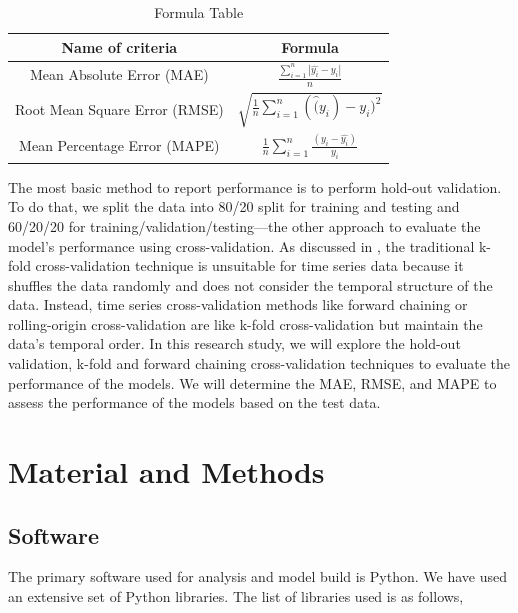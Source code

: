 \documentclass[mstat,12pt]{unswthesis}
\begin{document}
\begin{table}[h]
\centering
\caption{Formula Table}
\begin{tabular}{|c|c|}
\hline
\textbf{Name of criteria} & \textbf{Formula} \\ 
\hline
Mean Absolute Error (MAE) & $\frac{\sum_{i=1}^n|\hat{y_i}-y_i|}{n}$ \\ 
\hline
Root Mean Square Error (RMSE) & $\sqrt{\frac{1}{n}\sum_{i=1}^{n}(\hat(y_i) - y_i)^2}$ \\ 
\hline
Mean Percentage Error (MAPE) & $\frac{1}{n}\sum_{i=1}^{n}\frac{(y_i-\hat{y_i})}{y_i}$ \\ 
\hline
\end{tabular}
\end{table}

The most basic method to report performance is to perform hold-out
validation. To do that, we split the data into 80/20 split for training
and testing and 60/20/20 for training/validation/testing---the other
approach to evaluate the model's performance using cross-validation. As
discussed in \cite{rafferty2023forecasting}, the traditional k-fold
cross-validation technique is unsuitable for time series data because it
shuffles the data randomly and does not consider the temporal structure
of the data. Instead, time series cross-validation methods like forward
chaining or rolling-origin cross-validation are like k-fold
cross-validation but maintain the data's temporal order. In this
research study, we will explore the hold-out validation, k-fold and
forward chaining cross-validation techniques to evaluate the performance
of the models. We will determine the MAE, RMSE, and MAPE to assess the
performance of the models based on the test data.

\hypertarget{material-and-methods}{%
\chapter{Material and Methods}\label{material-and-methods}}

\hypertarget{software}{%
\section{Software}\label{software}}

The primary software used for analysis and model build is Python. We
have used an extensive set of Python libraries. The list of libraries
used is as follows,
\end{document}
